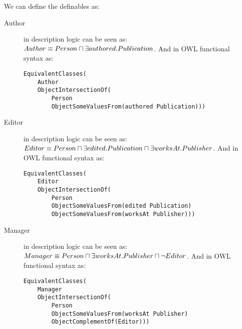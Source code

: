 \documentclass[a4paper,12pt]{article}
\begin{document}
We can define the definables as:
\begin{description}
\item[Author] in description logic can be seen as: $ Author \equiv Person\\
\sqcap \exists authored.Publication $.  And in OWL functional syntax as:
\begin{Verbatim}[samepage=true]
EquivalentClasses(
    Author
    ObjectIntersectionOf(
        Person
        ObjectSomeValuesFrom(authored Publication)))
\end{Verbatim}

\item[Editor] in description logic can be seen as: $ Editor \equiv Person\\
\sqcap \exists edited.Publication \sqcap \exists worksAt.Publisher $.  And in
OWL functional syntax as:
\begin{Verbatim}[samepage=true]
EquivalentClasses(
    Editor
    ObjectIntersectionOf(
        Person
        ObjectSomeValuesFrom(edited Publication)
        ObjectSomeValuesFrom(worksAt Publisher)))
\end{Verbatim}

\item[Manager] in description logic can be seen as: $ Manager \equiv Person\\
\sqcap \exists worksAt.Publisher \sqcap \neg Editor $.  And in OWL functional
syntax as:
\begin{Verbatim}[samepage=true]
EquivalentClasses(
    Manager
    ObjectIntersectionOf(
        Person
        ObjectSomeValuesFrom(worksAt Publisher)
        ObjectComplementOf(Editor)))
\end{Verbatim}
\end{description}
\end{document}
